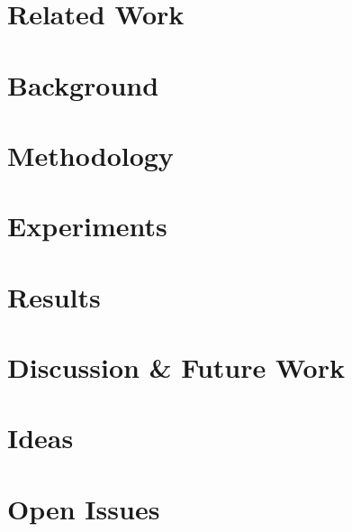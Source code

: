 \documentclass{article}
\begin{document}
\section{Related Work}


\section{Background}


\section{Methodology}


\section{Experiments}


\section{Results}


\section{Discussion \& Future Work}


\section*{Ideas}


\section*{Open Issues}


\printbibliography
\end{document}
